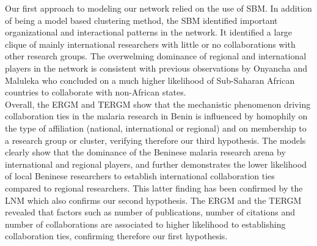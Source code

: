Our first approach to modeling our network relied on the use of SBM. In addition of being a model based clustering method, the SBM identified important organizational and interactional patterns in the network. It identified a large clique of mainly international researchers with little or no collaborations with other research groups. The overwelming dominance of regional and international players in the network is consistent with previous observations by Onyancha and Maluleka \cite{onyancha_knowledge_2011} who concluded on a much higher likelihood of Sub-Saharan African countries to collaborate with non-African states. \\
Overall, the ERGM and TERGM show that the mechanistic phenomenon driving collaboration ties in the malaria research in Benin is influenced by homophily on the type of affiliation (national, international or regional) and on membership to a research group or cluster, verifying therefore our third hypothesis. The models clearly show that the dominance of the Beninese malaria research arena by international and regional players, and further demonstrates the lower likelihood of local Beninese researchers to establish international collaboration ties compared to regional researchers. This latter finding has been confirmed by the LNM which also confirms our second hypothesis. The ERGM and the TERGM revealed that factors such as number of publications, number of citations and number of collaborations are associated to higher likelihood to establishing collaboration ties, confirming therefore our first hypothesis. \\
